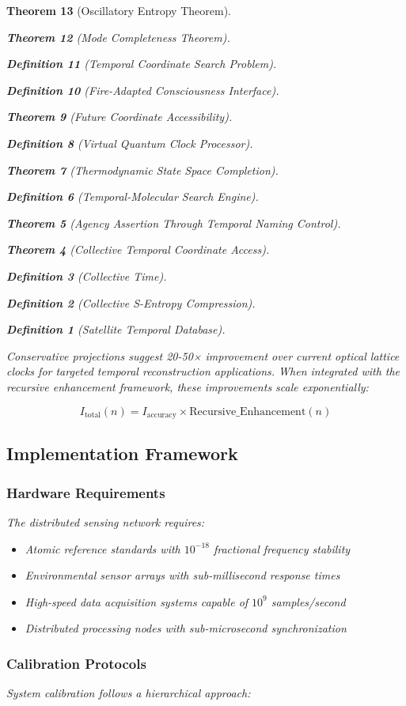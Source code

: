 \documentclass[12pt,a4paper]{article}
\newtheorem{theorem}{Theorem}[section]
\newtheorem{definition}[theorem]{Definition}
\begin{document}
\begin{theorem}[Oscillatory Entropy Theorem]
\begin{theorem}[Mode Completeness Theorem]
\begin{enumerate}
\begin{definition}[Temporal Coordinate Search Problem]
\begin{algorithm}
\begin{definition}[Fire-Adapted Consciousness Interface]
\begin{theorem}[Future Coordinate Accessibility]
\begin{definition}[Virtual Quantum Clock Processor]
\begin{itemize}
\begin{itemize}
\begin{theorem}[Thermodynamic State Space Completion]
\begin{definition}[Temporal-Molecular Search Engine]
\begin{theorem}[Agency Assertion Through Temporal Naming Control]
\begin{remark}
\begin{theorem}[Collective Temporal Coordinate Access]
\begin{definition}[Collective Time]
\begin{definition}[Collective S-Entropy Compression]
\begin{definition}[Satellite Temporal Database]
\begin{algorithm}
\begin{table}[h]
{{Conservative projections suggest 20-50× improvement over current optical lattice clocks for targeted temporal reconstruction applications. When integrated with the recursive enhancement framework, these improvements scale exponentially:

\begin{equation}
I_{\text{total}}(n) = I_{\text{accuracy}} \times \text{Recursive\_Enhancement}(n)
\end{equation}

\subsection{Implementation Framework}

\subsubsection{Hardware Requirements}

The distributed sensing network requires:

\begin{itemize}
\item Atomic reference standards with $10^{-18}$ fractional frequency stability
\item Environmental sensor arrays with sub-millisecond response times
\item High-speed data acquisition systems capable of $10^9$ samples/second
\item Distributed processing nodes with sub-microsecond synchronization
\end{itemize}

\subsubsection{Calibration Protocols}

System calibration follows a hierarchical approach:

}}
\end{table}
\end{algorithm}
\end{definition}
\end{definition}
\end{definition}
\end{theorem}
\end{remark}
\end{theorem}
\end{definition}
\end{theorem}
\end{itemize}
\end{itemize}
\end{definition}
\end{theorem}
\end{definition}
\end{algorithm}
\end{definition}
\end{enumerate}
\end{theorem}
\end{theorem}
\end{document}
